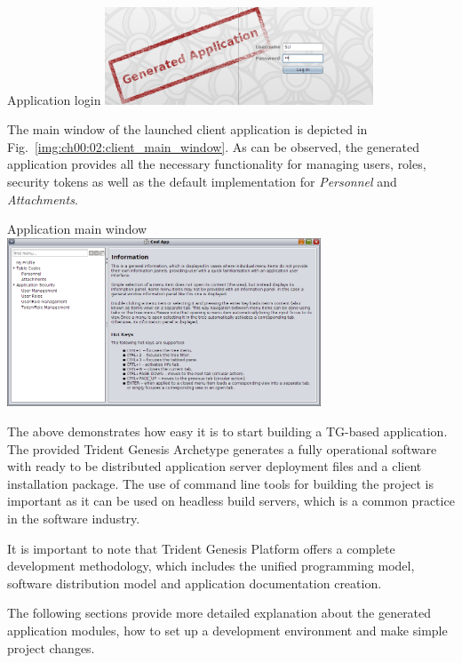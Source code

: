   \begin{image}{Application login}{\label{img:ch00:02:client_login}}    
    \includegraphics[width=0.6\textwidth]{parts/00-part/chapters/01-application-modules/images/04-client-login.png}
  \end{image}

  The main window of the launched client application is depicted in Fig.~\ref{img:ch00:02:client_main_window}.
  As can be observed, the generated application provides all the necessary functionality for managing users, roles, security tokens as well as the default implementation for \emph{Personnel} and \emph{Attachments}.

  \begin{image}{Application main window}{\label{img:ch00:02:client_main_window}}    
    \includegraphics[width=0.7\textwidth]{parts/00-part/chapters/01-application-modules/images/05-client-main-window.png}
  \end{image}

  The above demonstrates how easy it is to start building a TG-based application.
  The provided Trident Genesis Archetype generates a fully operational software with ready to be distributed application server deployment files and a client installation package.
  The use of command line tools for building the project is important as it can be used on headless build servers, which is a common practice in the software industry.

  It is important to note that Trident Genesis Platform offers a complete development methodology, which includes the unified programming model, software distribution model and application documentation creation.
  
  The following sections provide more detailed explanation about the generated application modules, how to set up a development environment and make simple project changes.


